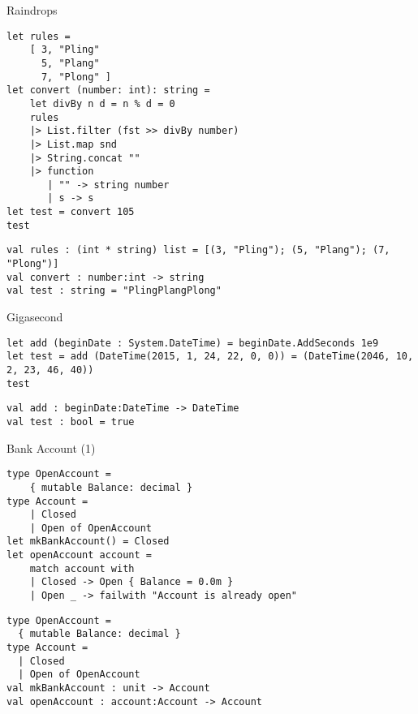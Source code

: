 \documentclass[t]{beamer}
\begin{document}
\begin{frame}[label={sec:org7a72229},fragile]{Raindrops}
 \begin{verbatim}
let rules =
    [ 3, "Pling"
      5, "Plang"
      7, "Plong" ]
let convert (number: int): string =
    let divBy n d = n % d = 0
    rules
    |> List.filter (fst >> divBy number)
    |> List.map snd
    |> String.concat ""
    |> function
       | "" -> string number
       | s -> s
let test = convert 105
test
\end{verbatim}

\begin{verbatim}
val rules : (int * string) list = [(3, "Pling"); (5, "Plang"); (7, "Plong")]
val convert : number:int -> string
val test : string = "PlingPlangPlong"
\end{verbatim}
\end{frame}

\begin{frame}[label={sec:orgd9a2859},fragile]{Gigasecond}
 \begin{verbatim}
let add (beginDate : System.DateTime) = beginDate.AddSeconds 1e9
let test = add (DateTime(2015, 1, 24, 22, 0, 0)) = (DateTime(2046, 10, 2, 23, 46, 40))
test
\end{verbatim}

\begin{verbatim}
val add : beginDate:DateTime -> DateTime
val test : bool = true
\end{verbatim}
\end{frame}

\begin{frame}[label={sec:org4693a46},fragile]{Bank Account (1)}
 \begin{verbatim}
type OpenAccount =
    { mutable Balance: decimal }
type Account =
    | Closed
    | Open of OpenAccount
let mkBankAccount() = Closed
let openAccount account =
    match account with
    | Closed -> Open { Balance = 0.0m }
    | Open _ -> failwith "Account is already open"
\end{verbatim}

\begin{verbatim}
type OpenAccount =
  { mutable Balance: decimal }
type Account =
  | Closed
  | Open of OpenAccount
val mkBankAccount : unit -> Account
val openAccount : account:Account -> Account
\end{verbatim}
\end{frame}
\end{document}
